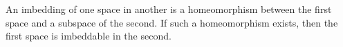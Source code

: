 An imbedding of one space in another is a homeomorphism between the first space and a subspace of the second. If such a homeomorphism exists, then the first space is imbeddable in the second.
